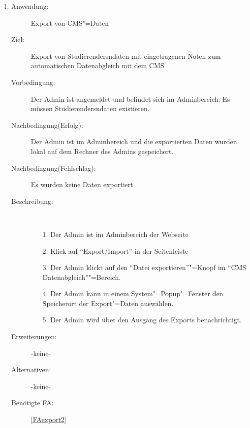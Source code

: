 \documentclass[parskip=full]{scrartcl}
\newcommand{\swtLabel}[1]{\textbf{/#1\arabic*0/}}
\begin{document}
\begin{enumerate} [label=\swtLabel{A}]
      \item \label{UCadminExport2}
    \begin{description}
    \item[Anwendung:] Export von \gls{CMS}"=Daten
    \item[Ziel:] Export von \glspl{Studierender}ndaten mit eingetragenen Noten zum automatischen Datenabgleich mit dem \gls{CMS}
    \item[Vorbedingung:] Der \gls{Admin} ist angemeldet und befindet sich im
    \gls{Admin}bereich. Es müssen \glspl{Studierender}ndaten existieren.
    \item[Nachbedingung(Erfolg):] Der \gls{Admin} ist im \gls{Admin}bereich und die exportierten Daten wurden lokal auf dem Rechner des \gls{Admin}s gespeichert.
    \item[Nachbedingung(Fehlschlag):] Es wurden keine Daten exportiert
    \item[Beschreibung:]~
    \begin{enumerate}
      \item[1.] Der \gls{Admin} ist im \gls{Admin}bereich der Webseite
      \item[2.] Klick auf \enquote{Export/Import}
      in der Seitenleiste
       \item[3.] Der \gls{Admin} klickt auf den \enquote{Datei exportieren}"=Knopf im \enquote{CMS Datenabgleich}"=Bereich.
       \item[4.] Der \gls{Admin} kann in einem System"=Popup"=Fenster den Speicherort der Export"=Daten auswählen.
      \item[5.] Der \gls{Admin} wird über den Ausgang des Exports benachrichtigt.
    \end{enumerate}
    \item[Erweiterungen:] -keine-
    \item[Alternativen:] -keine-
    \item[Benötigte FA:] \ref{FAexport2}
  \end{description}
  

\end{enumerate}
\end{document}
